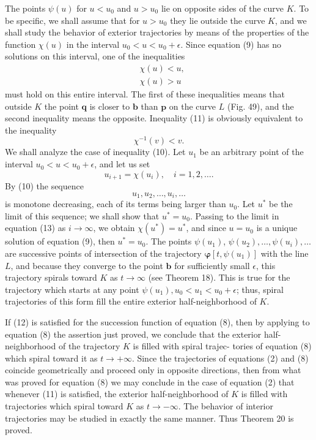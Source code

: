 \documentclass[10pt,a5paper]{book}
\makeatletter
\theoremstyle{plain}
\theoremstyle{definition}
\theoremstyle{remark}
\renewenvironment{proof}[1][\proofname]{\par
  \pushQED{\qed}%
  \normalfont\topsep6\p@\@plus6\p@\relax
  \trivlist
  \item\relax{\itshape #1\@addpunct{.}}\hspace\labelsep\ignorespaces
}{\popQED\endtrivlist\@endpefalse}
\makeatother
\begin{document}
\begin{proof}
The points $\psi(u)$ for $u<u_{0}$ and $u>u_{0}$ lie on opposite sides of the curve $K$. To be specific, we shall assume that for $u>u_{0}$ they lie outside the curve $K$, and we shall study the behavior of exterior trajectories by means of the properties of the function $\chi(u)$ in the interval $u_{0}<u<u_{0}+\epsilon$. Since equation (9) has no solutions on this interval, one of the inequalities
\begin{align*}
& \chi(u)<u,  \tag{10}\\
& \chi(u)>u \tag{11}
\end{align*}
must hold on this entire interval. The first of these inequalities means that outside $K$ the point $\mathbf{q}$ is closer to $\mathbf{b}$ than $\mathbf{p}$ on the curve $L$ (Fig. 49), and the second inequality means the opposite. Inequality (11) is obviously equivalent to the inequality
\begin{equation*}
\chi^{-1}(v)<v . \tag{12}
\end{equation*}
We shall analyze the case of inequality (10). Let $u_{1}$ be an arbitrary point of the interval $u_{0}<u<u_{0}+\epsilon$, and let us set
\begin{equation*}
u_{i+1}=\chi\left(u_{i}\right), \quad i=1,2, \ldots . \tag{13}
\end{equation*}
By (10) the sequence
\[
u_{1}, u_{2}, \ldots, u_{i}, \ldots
\]
is monotone decreasing, each of its terms being larger than $u_{0}$. Let $u^{*}$ be the limit of this sequence; we shall show that $u^{*}=u_{0}$. Passing to the limit in equation (13) as $i \rightarrow \infty$, we obtain $\chi\left(u^{*}\right)=u^{*}$, and since $u=u_{0}$ is a unique solution of equation (9), then $u^{*}=u_{0}$. The points $\psi\left(u_{1}\right)$, $\psi\left(u_{2}\right), \ldots, \psi\left(u_{i}\right), \ldots$ are successive points of intersection of the trajectory $\boldsymbol{\varphi}\left[t, \psi\left(u_{1}\right)\right]$ with the line $L$, and because they converge to the point $\mathbf{b}$ for sufficiently small $\epsilon$, this trajectory spirals toward $K$ as $t \rightarrow \infty$ (see Theorem 18). This is true for the trajectory which starts at any point $\psi\left(u_{1}\right), u_{0}<u_{1}<u_{0}+\epsilon$; thus, spiral trajectories of this form fill the entire exterior half-neighborhood of $K$.

If (12) is satisfied for the succession function of equation (8), then by applying to equation (8) the assertion just proved, we conclude that the exterior half-neighborhood of the trajectory $K$ is filled with spiral trajec-
tories of equation (8) which spiral toward it as $t \rightarrow+\infty$. Since the trajectories of equations (2) and (8) coincide geometrically and proceed only in opposite directions, then from what was proved for equation (8) we may conclude in the case of equation (2) that whenever (11) is satisfied, the exterior half-neighborhood of $K$ is filled with trajectories which spiral toward $K$ as $t \rightarrow-\infty$. The behavior of interior trajectories may be studied in exactly the same manner. Thus Theorem 20 is proved.
\end{proof}
\end{document}
